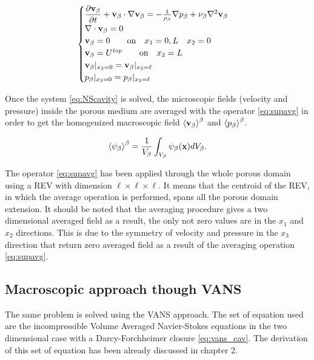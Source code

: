 
\begin{eqnarray}
\begin{cases}
\dfrac{\partial \textbf{v}_{\beta}}{\partial t} + \textbf{v}_{\beta} \cdot \nabla \textbf{v}_{\beta} = -\frac{1}{\rho_{\beta}} \nabla p_{\beta} + \nu_{\beta} \nabla^2  \textbf{v}_{\beta} \\
\nabla \cdot \textbf{v}_{\beta} = 0\\
\textbf{v}_{\beta} = 0 \qquad \text{on} \quad x_1 = 0,L \quad x_2 = 0 \\
\textbf{v}_{\beta} = U^{top} \qquad \text{on} \quad x_2 = L\\
\textbf{v}_{\beta}|_{x_3 = 0} = \textbf{v}_{\beta}|_{x_3 = \ell}  \\
p_{\beta}|_{x_3 = 0} = p_{\beta}|_{x_3 = \ell}
\end{cases}
\label{eq:NScavity}
\end{eqnarray}

Once the system \eqref{eq:NScavity} is solved, the microscopic fields (velocity and pressure) inside the porous medium are averaged with the operator \ref{eq:supavg} in order to get the homogenized macroscopic field ${\left< \textbf{v}_{\beta} \right>}^{\beta}$ and ${\left< p_{\beta} \right>}^{\beta}$.

\begin{equation}
	{\left< \psi_{\beta} \right>}^{\beta} = \dfrac{1}{V_\beta} \int_{V_\beta} \psi_\beta (\mathbf{x}) d V_\beta.
	\label{eq:supavg}
\end{equation}

The operator \eqref{eq:supavg} has been applied through the whole porous domain using a REV with dimension $\ell \times \ell \times \ell$.
It means that the centroid of the REV, in which the average operation is performed, spans all the porous domain extension.
It should be noted that the averaging procedure gives a two dimensional averaged field as a result, the only not zero values are in the $x_1$ and $x_2$ directions. This is due to the symmetry of velocity and pressure in the $x_3$ direction that return zero averaged field as a result of the averaging operation \eqref{eq:supavg}.

\subsection{Macroscopic approach though VANS}

The same problem is solved using the VANS approach.
The set of equation used are the incompressible Volume Averaged Navier-Stokes equations in the two dimensional case with a Darcy-Forchheimer closure \eqref{eq:vans_cav}.
The derivation of this set of equation has been already discussed in chapter 2.

